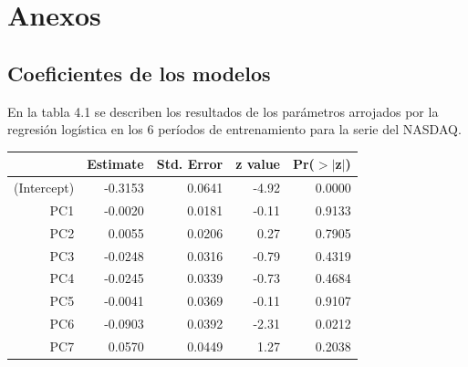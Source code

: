 \documentclass[a4paper,12pt]{Latex/Classes/PhDthesisPSnPDF}
\begin{document}
\chapter{Anexos}

\section{Coeficientes de los modelos}

En la tabla 4.1 se describen los resultados de los parámetros arrojados por la regresión logística en los 6 períodos de entrenamiento para la serie del NASDAQ.
\begin{center}
\begin{table}[ht]
\centering
\begin{tabular}{rrrrr}
  \hline
 & Estimate & Std. Error & z value & Pr($>$$|$z$|$) \\ 
  \hline
(Intercept) & -0.3153 & 0.0641 & -4.92 & 0.0000 \\ 
  PC1 & -0.0020 & 0.0181 & -0.11 & 0.9133 \\ 
  PC2 & 0.0055 & 0.0206 & 0.27 & 0.7905 \\ 
  PC3 & -0.0248 & 0.0316 & -0.79 & 0.4319 \\ 
  PC4 & -0.0245 & 0.0339 & -0.73 & 0.4684 \\ 
  PC5 & -0.0041 & 0.0369 & -0.11 & 0.9107 \\ 
  PC6 & -0.0903 & 0.0392 & -2.31 & 0.0212 \\ 
  PC7 & 0.0570 & 0.0449 & 1.27 & 0.2038 \\ 
   \hline
\end{tabular}
\end{table}\end{center}
\end{document}
